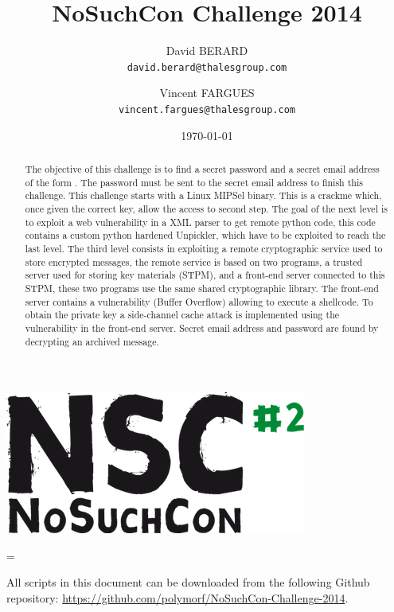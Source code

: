 \documentclass[a4paper]{article}
\title{NoSuchCon Challenge 2014}
\author{
  David BERARD\\
  \texttt{david.berard@thalesgroup.com}
  \and
  Vincent FARGUES\\
  \texttt{vincent.fargues@thalesgroup.com}
}
\date{\today}
\newenvironment{info}
  {\par\begin{mdframed}[linewidth=2pt,linecolor=blue]%
    \begin{list}{}{\leftmargin=0cm
                   \labelwidth=\leftmargin}\item[]}
  {\end{list}\end{mdframed}\par}
\begin{document}
\maketitle

\vspace{20 mm}
\begin{abstract}
The objective of this challenge is to find a secret password and a secret email address of the form . The password must be sent to the secret email address to finish this challenge.\newline
This challenge starts with a Linux MIPSel binary. This is a crackme which, once given the correct key, allow the access to second step. The goal of the next level is to exploit a web vulnerability in a XML parser to get remote python code, this code contains a custom python hardened Unpickler, which have to be exploited to reach the last level.
The third level consists in exploiting a remote cryptographic service used to store encrypted messages, the remote service is based on two programs, a trusted server used for storing key materials (STPM), and a front-end server connected to this STPM, these two programs use the same shared cryptographic library. 
The front-end server contains a vulnerability (Buffer Overflow) allowing to execute a shellcode. To obtain the private key a side-channel cache attack is implemented using the vulnerability in the front-end server. Secret email address and password are found by decrypting an archived message.
\end{abstract}

\vspace{50 mm}
\begin{center}
\includegraphics[scale=0.5]{nosuchcon-logo}
\end{center}

\newpage
\begin{info}
All scripts in this document can be downloaded from the following Github repository:\newline
\href{https://github.com/polymorf/NoSuchCon-Challenge-2014}{https://github.com/polymorf/NoSuchCon-Challenge-2014}.
\end{info}
\tableofcontents{}
\end{document}
